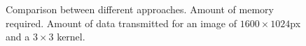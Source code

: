 \documentclass[conference,compsoc]{IEEEtran}
\begin{document}
\begin{figure}[!t]
\centering
{}
\hfil %
\centering
{}
\caption{Comparison between different approaches. \protect{} Amount of
  memory required. \protect{} Amount of data transmitted for an image of $1600\times1024$px and a $3\times3$ kernel.}
\label{comp}
\end{figure}
\end{document}
